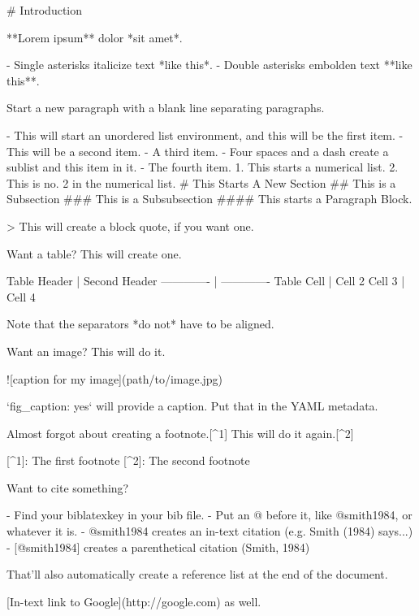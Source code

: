 \documentclass[11pt,]{article}
\newenvironment{Shaded}{\begin{snugshade}}{\end{snugshade}}
\newcommand{\BaseNTok}[1]{\textcolor[rgb]{0.00,0.00,0.81}{{#1}}}
\newcommand{\FloatTok}[1]{\textcolor[rgb]{0.00,0.00,0.81}{{#1}}}
\newcommand{\OtherTok}[1]{\textcolor[rgb]{0.56,0.35,0.01}{{#1}}}
\newcommand{\FunctionTok}[1]{\textcolor[rgb]{0.00,0.00,0.00}{{#1}}}
\newcommand{\AlertTok}[1]{\textcolor[rgb]{0.94,0.16,0.16}{{#1}}}
\newcommand{\NormalTok}[1]{{#1}}
\begin{document}
\begin{Shaded}
\begin{Highlighting}[]

\FunctionTok{# Introduction}

\NormalTok{**Lorem ipsum** dolor *sit amet*. }

\NormalTok{- }\FloatTok{Single asterisks italicize text *like this*. }
\FloatTok{- Double asterisks embolden text **like this**.}

\FloatTok{Start a new paragraph with a blank line separating paragraphs.}

\FloatTok{- This will start an unordered list environment, and this will be the first item.}
\FloatTok{- This will be a second item.}
\FloatTok{- A third item.}
\FloatTok{    - Four spaces and a dash create a sublist and this item in it.}
\FloatTok{- The fourth item.}
\FloatTok{  }  
\FloatTok{1. This starts a numerical list.}
\FloatTok{2. This is no. 2 in the numerical list.}
\FloatTok{  }  
\FloatTok{# This Starts A New Section}
\FloatTok{## This is a Subsection}
\FloatTok{### This is a Subsubsection}
\FloatTok{#### This starts a Paragraph Block.}

\FloatTok{> This will create a block quote, if you want one.}

\FloatTok{Want a table? This will create one.}

\FloatTok{Table Header  | Second Header}
\FloatTok{------------- | -------------}
\FloatTok{Table Cell    | Cell 2}
\FloatTok{Cell 3        | Cell 4 }

\FloatTok{Note that the separators *do not* have to be aligned.}

\FloatTok{Want an image? This will do it.}

\AlertTok{![caption for my image](path/to/image.jpg)}

\BaseNTok{`fig_caption: yes`}\FloatTok{ will provide a caption. Put that in the YAML metadata.}

\FloatTok{Almost forgot about creating a footnote.}\OtherTok{[^1]}\FloatTok{ This will do it again.}\OtherTok{[^2]}

\OtherTok{[^1]}\FloatTok{: The first footnote}
\OtherTok{[^2]}\FloatTok{: The second footnote}

\FloatTok{Want to cite something? }

\FloatTok{- Find your biblatexkey in your bib file.}
\FloatTok{- Put an @ before it, like @smith1984, or whatever it is.}
\FloatTok{- @smith1984 creates an in-text citation (e.g. Smith (1984) says...)}
\FloatTok{- [@smith1984] creates a parenthetical citation (Smith, 1984)}

\FloatTok{That'll also automatically create a reference list at the end of the document.}

\OtherTok{[In-text link to Google](http://google.com)}\FloatTok{ as well.}
\end{Highlighting}
\end{Shaded}
\end{document}
